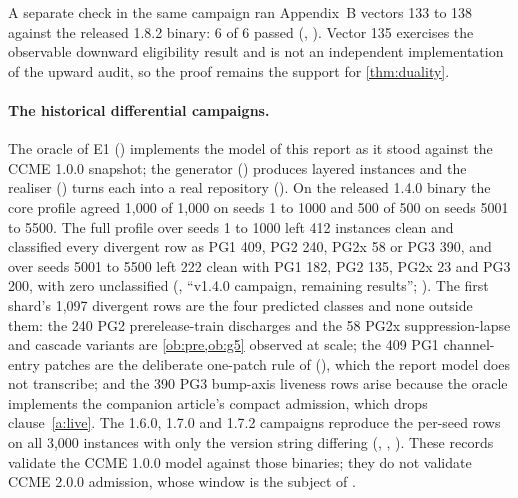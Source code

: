 A separate check in the same campaign ran \SPEC{} Appendix~B vectors 133 to
138 against the released 1.8.2 binary: 6 of 6 passed
(, ). Vector 135
exercises the observable downward eligibility result and is not an independent
implementation of the upward audit, so the proof remains the support for
\cref{thm:duality}.

\paragraph{The historical differential campaigns.}
The oracle of E1 () implements the model of
this report as it stood against the CCME 1.0.0 snapshot; the generator
() produces layered instances and the realiser
() turns each into a real repository
(). On the released 1.4.0 binary the core
profile agreed 1,000 of 1,000 on seeds 1 to 1000 and 500 of 500 on seeds 5001
to 5500. The full profile over seeds 1 to 1000 left 412 instances clean and
classified every divergent row as PG1 409, PG2 240, PG2x 58 or PG3 390, and
over seeds 5001 to 5500 left 222 clean with PG1 182, PG2 135, PG2x 23 and PG3
200, with zero unclassified (, ``v1.4.0
campaign, remaining results''; ).
The first shard's 1,097 divergent rows are the four predicted classes and
none outside them: the 240 PG2 prerelease-train discharges and the 58 PG2x
suppression-lapse and cascade variants are \cref{ob:pre,ob:g5} observed at
scale; the 409 PG1 channel-entry patches are the deliberate one-patch rule of
 (), which the report model does not transcribe; and the
390 PG3 bump-axis liveness rows arise because the oracle implements the
companion article's compact admission, which drops clause~\ref{a:live}. The
1.6.0, 1.7.0 and 1.7.2 campaigns reproduce the per-seed rows on all 3,000
instances with only the version string differing
(,
, ). These
records validate the CCME 1.0.0 model against those binaries; they do not
validate CCME 2.0.0 admission, whose window is the subject of .

